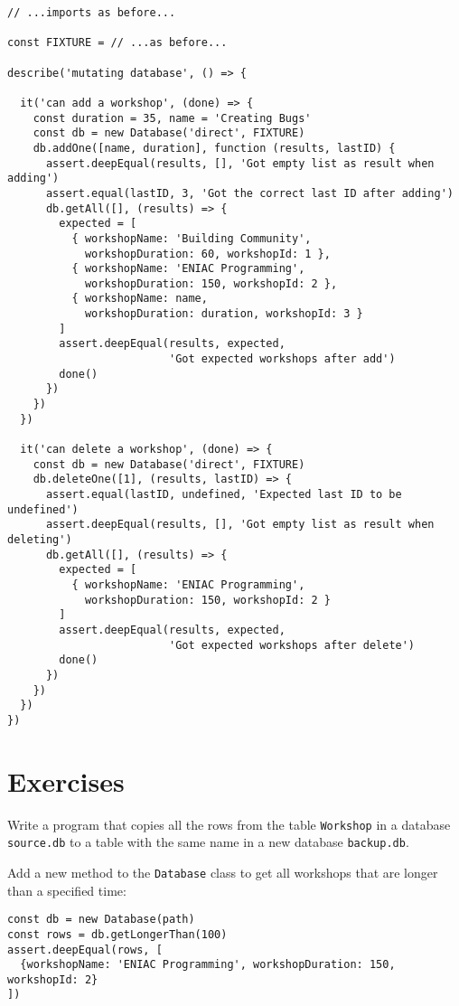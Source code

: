 \begin{verbatim}
// ...imports as before...

const FIXTURE = // ...as before...

describe('mutating database', () => {

  it('can add a workshop', (done) => {
    const duration = 35, name = 'Creating Bugs'
    const db = new Database('direct', FIXTURE)
    db.addOne([name, duration], function (results, lastID) {
      assert.deepEqual(results, [], 'Got empty list as result when adding')
      assert.equal(lastID, 3, 'Got the correct last ID after adding')
      db.getAll([], (results) => {
        expected = [
          { workshopName: 'Building Community',
            workshopDuration: 60, workshopId: 1 },
          { workshopName: 'ENIAC Programming',
            workshopDuration: 150, workshopId: 2 },
          { workshopName: name,
            workshopDuration: duration, workshopId: 3 }
        ]
        assert.deepEqual(results, expected,
                         'Got expected workshops after add')
        done()
      })
    })
  })

  it('can delete a workshop', (done) => {
    const db = new Database('direct', FIXTURE)
    db.deleteOne([1], (results, lastID) => {
      assert.equal(lastID, undefined, 'Expected last ID to be undefined')
      assert.deepEqual(results, [], 'Got empty list as result when deleting')
      db.getAll([], (results) => {
        expected = [
          { workshopName: 'ENIAC Programming',
            workshopDuration: 150, workshopId: 2 }
        ]
        assert.deepEqual(results, expected,
                         'Got expected workshops after delete')
        done()
      })
    })
  })
})
\end{verbatim}

\section{Exercises}\label{s:db-exercises}


Write a program that copies all the rows
from the table \texttt{Workshop} in a database \texttt{source.db}
to a table with the same name in a new database \texttt{backup.db}.


Add a new method to the \texttt{Database} class
to get all workshops that are longer than a specified time:

\begin{verbatim}
const db = new Database(path)
const rows = db.getLongerThan(100)
assert.deepEqual(rows, [
  {workshopName: 'ENIAC Programming', workshopDuration: 150, workshopId: 2}
])
\end{verbatim}

